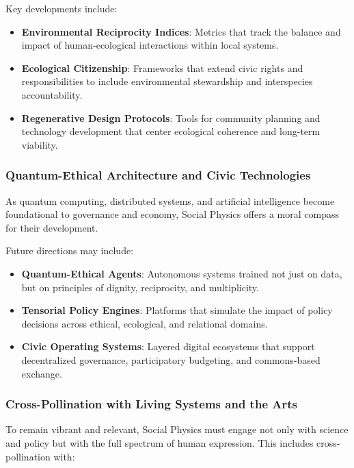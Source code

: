 \documentclass{article}
\theoremstyle{plain}
\theoremstyle{claimstyle}
\begin{document}
Key developments include:

\begin{itemize}
    \item \textbf{Environmental Reciprocity Indices}: Metrics that track the balance and impact of human-ecological interactions within local systems.
    \item \textbf{Ecological Citizenship}: Frameworks that extend civic rights and responsibilities to include environmental stewardship and interspecies accountability.
    \item \textbf{Regenerative Design Protocols}: Tools for community planning and technology development that center ecological coherence and long-term viability.
\end{itemize}

\subsubsection{Quantum-Ethical Architecture and Civic Technologies}

As quantum computing, distributed systems, and artificial intelligence become foundational to governance and economy, Social Physics offers a moral compass for their development.

Future directions may include:

\begin{itemize}
    \item \textbf{Quantum-Ethical Agents}: Autonomous systems trained not just on data, but on principles of dignity, reciprocity, and multiplicity.
    \item \textbf{Tensorial Policy Engines}: Platforms that simulate the impact of policy decisions across ethical, ecological, and relational domains.
    \item \textbf{Civic Operating Systems}: Layered digital ecosystems that support decentralized governance, participatory budgeting, and commons-based exchange.
\end{itemize}

\subsubsection{Cross-Pollination with Living Systems and the Arts}

To remain vibrant and relevant, Social Physics must engage not only with science and policy but with the full spectrum of human expression. This includes cross-pollination with:
\end{document}
